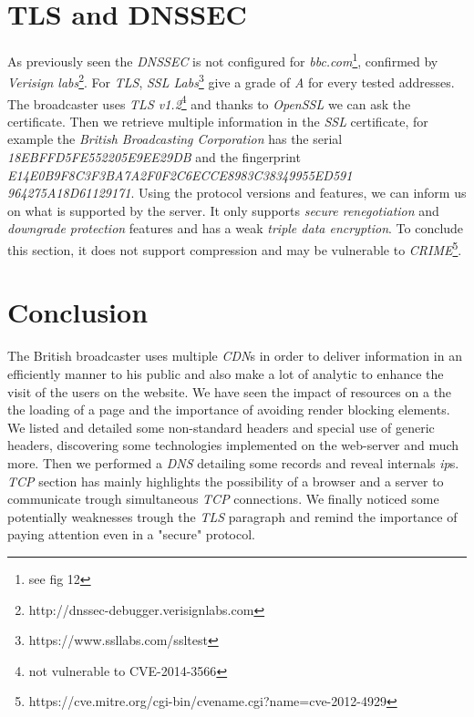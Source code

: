 \documentclass[conference]{IEEEtran}
\begin{document}
\section{TLS and DNSSEC}
As previously seen the \textit{DNSSEC} is not configured for \textit{bbc.com}\footnote{see fig 12}, confirmed by \textit{Verisign labs}\footnote{http://dnssec-debugger.verisignlabs.com}.
For \textit{TLS}, \textit{SSL Labs}\footnote{https://www.ssllabs.com/ssltest} give a grade of \textit{A} for every tested addresses. The broadcaster uses \textit{TLS v1.2}\footnote{not vulnerable to CVE-2014-3566} and thanks to \textit{OpenSSL} we can ask the certificate.  Then we retrieve multiple information in the \textit{SSL} certificate, for example the \textit{British Broadcasting Corporation} has the serial \textit{18EBFFD5FE552205E9EE29DB} and the fingerprint \textit{E14E0B9F8C3F3BA7A2F0F2C6ECCE8983C38349955ED591
964275A18D61129171}. Using the protocol versions and features, we can inform us on what is supported by the server. It only supports \textit{secure renegotiation} and \textit{downgrade protection} features and has a weak \textit{triple data encryption}. To conclude this section, it does not support compression and may be vulnerable to \textit{CRIME}\footnote{https://cve.mitre.org/cgi-bin/cvename.cgi?name=cve-2012-4929}.   

\section{Conclusion}
The British broadcaster uses multiple \textit{CDN}s in order to deliver information in an efficiently manner to his public and also make a lot of analytic to enhance the visit of the users on the website. We have seen the impact of resources on a the the loading of a page and the importance of avoiding render blocking elements. We listed and detailed some non-standard headers and special use of generic headers, discovering some technologies implemented on the web-server and much more. Then we performed a \textit{DNS} detailing some records and reveal internals \textit{ip}s. \textit{TCP} section has mainly highlights the possibility of a browser and a server to communicate trough simultaneous \textit{TCP} connections. We finally noticed some potentially weaknesses trough the \textit{TLS} paragraph and remind the importance of paying attention even in a "secure" protocol. 
\end{document}
